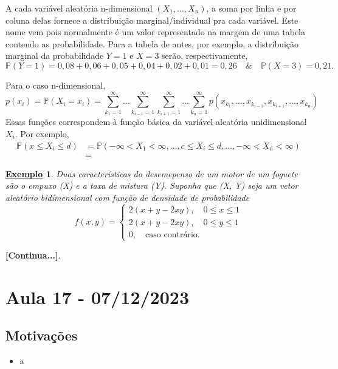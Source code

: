 \documentclass{article}
\newtheorem{example}{\underline{Exemplo}}
\begin{document}
  A cada variável aleatória n-dimensional \((X_{1}, \dotsc , X_{n})\), a soma por linha e por coluna delas fornece a distribuição marginal/individual pra cada 
variável. Este nome vem pois normalmente é um valor representado na margem de uma tabela contendo as probabilidade. Para a tabela de antes, por exemplo, a distribuição
marginal da probabilidade \(Y = 1\) e \(X = 3\) serão, respectivamente, 
  \[
    \mathbb{P}(Y=1) = 0,08 + 0,06 + 0,05 + 0,04 + 0,02 + 0,01 = 0,26\quad\&\quad \mathbb{P}(X = 3) = 0,21.
  \]

  Para o caso n-dimensional, 
    \[
      p(x_{i}) = \mathbb{P}(X_{i} = x_{i}) = \sum\limits_{k_{1}=1}^{\infty}\dotsc \sum\limits_{k_{i-1}=1}^{\infty}\sum\limits_{k_{i+1}=1}^{\infty}\dotsc \sum\limits_{k_{n}=1}^{\infty}p(x_{k_{1}}, \dotsc , x_{k_{i-1}},x_{k_{i+1}},\dotsc ,x_{k_{n}})
    \]
  Essas funções correspondem à função básica da variável aleatória unidimensional \(X_{i}\). Por exemplo, 
 \begin{align*}
   \mathbb{P}(x \leq X_{i}\leq d) &= \mathbb{P}(-\infty<X_{1}<\infty, \dotsc , c \leq X_{i}\leq d, \dotsc , -\infty<X_{n} < \infty)\\
                                  &=
 \end{align*}
 \begin{example}
  Duas características do desemepenso de um motor de um foguete são o empuxo (X) e a taxa de mistura (Y). Suponha que (X, Y) seja um vetor aleatório bidimensional com 
função de densidade de probabilidade 
  \[
    f(x, y)  = \left\{\begin{array}{ll}
        2(x+y-2xy),\quad 0 \leq x \leq 1\\
        2(x+y-2xy),\quad 0 \leq y \leq 1\\
        0,\quad \text{caso contrário}.
      \end{array}\right.
  \]
 \end{example}

\textbf{[Continua...]}.
\newpage

\section{Aula 17 - 07/12/2023}
\subsection{Motivações} 
\begin{itemize}
  \item a
\end{itemize}
\end{document}
